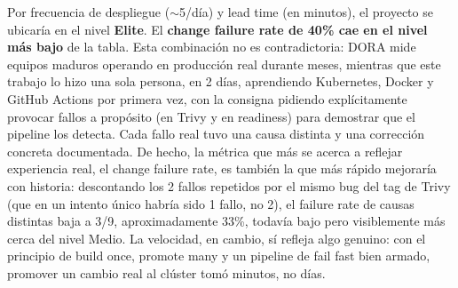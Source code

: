 \documentclass[11pt,a4paper]{article}
\begin{document}
Por frecuencia de despliegue ($\sim$5/día) y lead time (en minutos), el proyecto se ubicaría en
el nivel \textbf{Elite}. El \textbf{change failure rate de 40\% cae en el nivel más bajo} de la
tabla. Esta combinación no es contradictoria: DORA mide equipos maduros operando en producción
real durante meses, mientras que este trabajo lo hizo una sola persona, en 2 días, aprendiendo
Kubernetes, Docker y GitHub Actions por primera vez, con la consigna pidiendo explícitamente
provocar fallos a propósito (en Trivy y en readiness) para demostrar que el pipeline los detecta.
Cada fallo real tuvo una causa distinta y una corrección concreta documentada. De hecho, la
métrica que más se acerca a reflejar experiencia real, el change failure rate, es también la que
más rápido mejoraría con historia: descontando los 2 fallos repetidos por el mismo bug del tag
de Trivy (que en un intento único habría sido 1 fallo, no 2), el failure rate de causas distintas
baja a 3/9, aproximadamente 33\%, todavía bajo pero visiblemente más cerca del nivel Medio. La
velocidad, en cambio, sí refleja algo genuino: con el principio de build once, promote many y un
pipeline de fail fast bien armado, promover un cambio real al clúster tomó minutos, no días.
\end{document}
